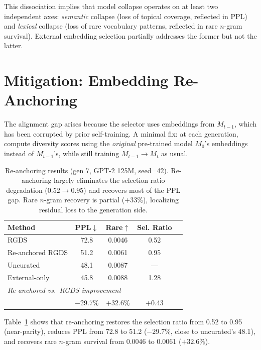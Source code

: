 \documentclass[11pt,a4paper]{article}
\begin{document}
This dissociation implies that model collapse operates on at least two independent axes: \emph{semantic} collapse (loss of topical coverage, reflected in PPL) and \emph{lexical} collapse (loss of rare vocabulary patterns, reflected in rare $n$-gram survival).
External embedding selection partially addresses the former but not the latter.

\section{Mitigation: Embedding Re-Anchoring}
\label{sec:mitigation}

The alignment gap arises because the selector uses embeddings from $M_{t-1}$, which has been corrupted by prior self-training.
A minimal fix: at each generation, compute diversity scores using the \emph{original} pre-trained model $M_0$'s embeddings instead of $M_{t-1}$'s, while still training $M_{t-1} \to M_t$ as usual.

\begin{table}[t]
\centering
\small
\begin{tabular}{lcccc}
\toprule
\textbf{Method} & \textbf{PPL}$\downarrow$ & \textbf{Rare}$\uparrow$ & \textbf{Sel. Ratio} \\
\midrule
RGDS & 72.8 & 0.0046 & 0.52 \\
Re-anchored RGDS & 51.2 & 0.0061 & 0.95 \\
Uncurated & 48.1 & 0.0087 & --- \\
External-only & 45.8 & 0.0088 & 1.28 \\
\midrule
\multicolumn{4}{l}{\textit{Re-anchored vs.\ RGDS improvement}} \\
 & $-$29.7\% & +32.6\% & +0.43 \\
\bottomrule
\end{tabular}
\caption{Re-anchoring results (gen 7, GPT-2 125M, seed=42). Re-anchoring largely eliminates the selection ratio degradation ($0.52 \to 0.95$) and recovers most of the PPL gap. Rare $n$-gram recovery is partial ($+33\%$), localizing residual loss to the generation side.}
\label{tab:reanchor}
\end{table}

Table~\ref{tab:reanchor} shows that re-anchoring restores the selection ratio from 0.52 to 0.95 (near-parity), reduces PPL from 72.8 to 51.2 ($-29.7\%$, close to uncurated's 48.1), and recovers rare $n$-gram survival from 0.0046 to 0.0061 ($+32.6\%$).
\end{document}
